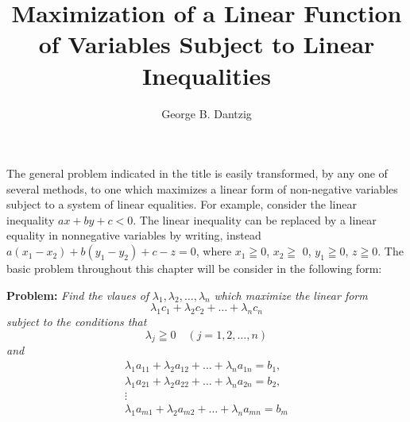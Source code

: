 \documentclass[leqno]{article}
\begin{document}
\author{George B. Dantzig}
\title{Maximization of a Linear Function of Variables Subject to Linear Inequalities}
\maketitle

The general problem indicated in the title is easily transformed, by any one of several methods, to one which maximizes a linear form of non-negative variables subject to a system of linear equalities. For example, consider the linear inequality $ax+by+c<0$. The linear inequality can be replaced by a linear equality in nonnegative variables by writing, instead $a(x_1-x_2) + b(y_1-y_2)+c-z=0$, where $x_1\geqq 0$, $x_2 \geqq$  0, $y_1 \geqq 0$, $z\geqq 0$. The basic problem throughout this chapter will be consider in the following form:


\textbf{Problem: }\textit{Find the vlaues of }$\lambda_1, \lambda_2, \dots,\lambda_n$ \textit{which maximize the linear form}
\begin{equation}
	\lambda_1 c_1 + \lambda_2 c_2 + \dots + \lambda_n c_n
\end{equation}
\textit{subject to the conditions that}
\begin{equation}
	\lambda_j \geqq 0 \quad (j=1,2,\dots,n)
\end{equation}
\textit{and}
\begin{equation}
	\begin{gathered}
	\lambda_1 a_{11} + \lambda_2 a_{12} + \dots + \lambda_n a_{1n} = b_1,\\
	\lambda_1 a_{21} + \lambda_2 a_{22} + \dots + \lambda_n a_{2n} = b_2,\\
	\vdots\\ %
	\lambda_1 a_{m1} + \lambda_2 a_{m2} + \dots + \lambda_n a_{mn} = b_m
	\end{gathered}
\end{equation}
\end{document}
